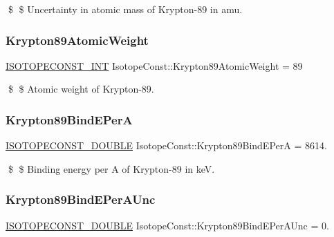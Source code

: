 \$ \$ Uncertainty in atomic mass of Krypton-\/89 in amu. \mbox{\label{group___isotope_const-_krypton-_kr89_ga4748f24202c41bd21d8fc33849bb593f}} 
\subsubsection{\texorpdfstring{Krypton89\+Atomic\+Weight}{Krypton89AtomicWeight}}
{\footnotesize\ttfamily \mbox{\hyperlink{group___isotope_const-_macros_ga5f18360b3e99483a35c32d789e62621c}{I\+S\+O\+T\+O\+P\+E\+C\+O\+N\+S\+T\+\_\+\+I\+NT}} Isotope\+Const\+::\+Krypton89\+Atomic\+Weight = 89}

\$ \$ Atomic weight of Krypton-\/89. \mbox{\label{group___isotope_const-_krypton-_kr89_gad6aeb49ee2d7401018c91755bb9c5211}} 
\subsubsection{\texorpdfstring{Krypton89\+Bind\+E\+PerA}{Krypton89BindEPerA}}
{\footnotesize\ttfamily \mbox{\hyperlink{group___isotope_const-_macros_ga8f45a7272ce02c0b4c65c44636ed719a}{I\+S\+O\+T\+O\+P\+E\+C\+O\+N\+S\+T\+\_\+\+D\+O\+U\+B\+LE}} Isotope\+Const\+::\+Krypton89\+Bind\+E\+PerA = 8614.}

\$ \$ Binding energy per A of Krypton-\/89 in keV. \mbox{\label{group___isotope_const-_krypton-_kr89_gaee6e08e6c0191ab7de507617b23caacc}} 
\subsubsection{\texorpdfstring{Krypton89\+Bind\+E\+Per\+A\+Unc}{Krypton89BindEPerAUnc}}
{\footnotesize\ttfamily \mbox{\hyperlink{group___isotope_const-_macros_ga8f45a7272ce02c0b4c65c44636ed719a}{I\+S\+O\+T\+O\+P\+E\+C\+O\+N\+S\+T\+\_\+\+D\+O\+U\+B\+LE}} Isotope\+Const\+::\+Krypton89\+Bind\+E\+Per\+A\+Unc = 0.}

